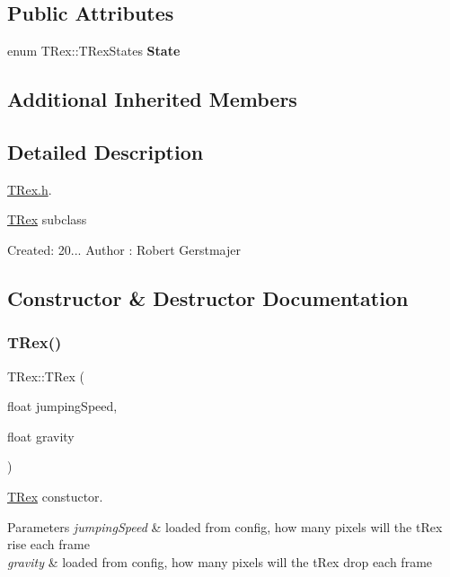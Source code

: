 \subsection*{Public Attributes}
\begin{DoxyCompactItemize}
\item 
\mbox{\label{class_t_rex_afac420bc35ec1ba3aab6d7016285a79e}} 
enum T\+Rex\+::\+T\+Rex\+States {\bfseries State}
\end{DoxyCompactItemize}
\subsection*{Additional Inherited Members}


\subsection{Detailed Description}
\mbox{\hyperlink{_t_rex_8h_source}{T\+Rex.\+h}}. 

\mbox{\hyperlink{class_t_rex}{T\+Rex}} subclass

Created\+: 20... Author \+: Robert Gerstmajer 

\subsection{Constructor \& Destructor Documentation}
\mbox{\label{class_t_rex_ae762432f9b24294e971b9f62191f26e9}} 
\subsubsection{\texorpdfstring{T\+Rex()}{TRex()}}
{\footnotesize\ttfamily T\+Rex\+::\+T\+Rex (\begin{DoxyParamCaption}\item[{float}]{jumping\+Speed,  }\item[{float}]{gravity }\end{DoxyParamCaption})}



\mbox{\hyperlink{class_t_rex}{T\+Rex}} constuctor. 


\begin{DoxyParams}{Parameters}
{\em jumping\+Speed} & loaded from config, how many pixels will the t\+Rex rise each frame \\
\hline
{\em gravity} & loaded from config, how many pixels will the t\+Rex drop each frame \\
\hline
\end{DoxyParams}


